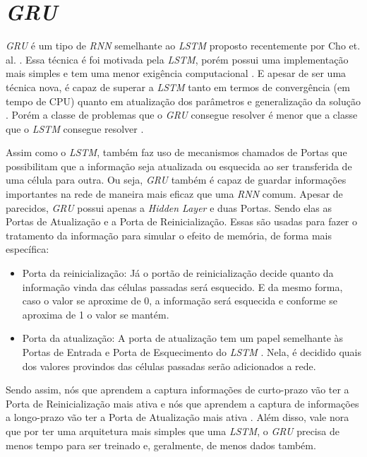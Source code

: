 \section{\textit{\acrfull{GRU}}}

\textit{\acrshort{GRU}} é um tipo de \textit{\acrshort{RNN}} semelhante ao \textit{\acrshort{LSTM}} proposto recentemente por Cho et. al. \cite{cho2014}. Essa técnica é foi motivada pela \textit{\acrshort{LSTM}}, porém possui uma implementação mais simples e tem uma menor exigência computacional \cite{cho2014}. E apesar de ser uma técnica nova, é capaz de superar a \textit{\acrshort{LSTM}} tanto em termos de convergência (em tempo de CPU) quanto em atualização dos parâmetros e generalização da solução \cite{chung2014empirical}. Porém a classe de problemas que o \textit{\acrshort{GRU}} consegue resolver é menor que a classe que o \textit{\acrshort{LSTM}} consegue resolver \cite{weiss2018}.

Assim como o \textit{\acrshort{LSTM}}, também faz uso de mecanismos chamados de Portas que possibilitam que a informação seja atualizada ou esquecida ao ser transferida de uma célula para outra. Ou seja, \textit{\acrshort{GRU}} também é capaz de guardar informações importantes na rede de maneira mais eficaz que uma \textit{\acrshort{RNN}} comum. Apesar de parecidos, \textit{\acrshort{GRU}} possui apenas a \textit{Hidden Layer} e duas Portas. Sendo elas as Portas de Atualização e a Porta de Reinicialização. Essas são usadas para fazer o tratamento da informação para simular o efeito de memória, de forma mais específica:

\begin{itemize}
    \item Porta da reinicialização: Já o portão de reinicialização decide quanto da informação vinda das células passadas será esquecido. E da mesmo forma, caso o valor se aproxime de 0, a informação será esquecida e conforme se aproxima de 1 o valor se mantém.
    
    \item Porta da atualização: A porta de atualização tem um papel semelhante às Portas de Entrada e Porta de Esquecimento do \textit{\acrshort{LSTM}} . Nela, é decidido quais dos valores provindos das células passadas serão adicionados a rede.
\end{itemize}

Sendo assim, nós que aprendem a captura informações de curto-prazo vão ter a Porta de Reinicialização mais ativa e nós que aprendem a captura de informações a longo-prazo vão ter a Porta de Atualização mais ativa \cite{cho2014}. Além disso, vale nora que por ter uma arquitetura mais simples que uma \textit{\acrshort{LSTM}}, o \textit{\acrshort{GRU}} precisa de menos tempo para ser treinado e, geralmente, de menos dados também.

